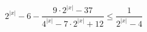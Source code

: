 \begin{ex}[type=inequality]
	\begin{condition}
		\( 2^{|x|}-6-\dfrac{9\cdot2^{|x|}-37}{4^{|x|}-7\cdot2^{|x|}+12}\le\dfrac{1}{2^{|x|}-4} \)
	\end{condition}
\end{ex}